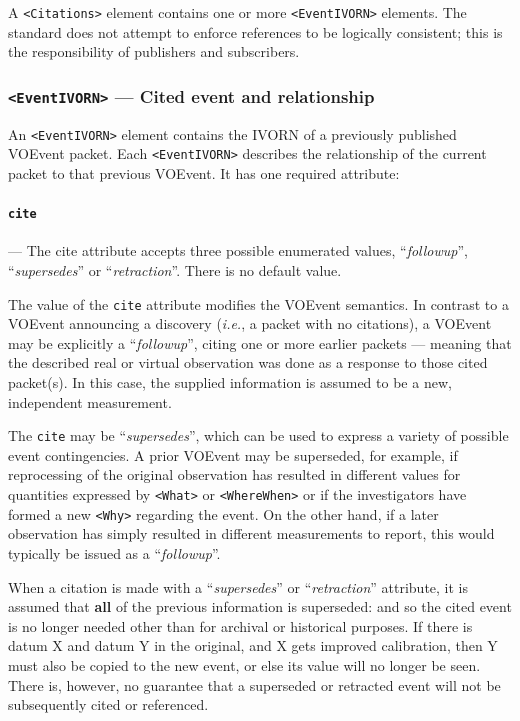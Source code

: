 \documentclass[11pt,a4paper]{ivoa}
\begin{document}
A {\tt <Citations>} element contains one or more {\tt <EventIVORN>} elements. The standard does not attempt to enforce references to be logically consistent; this is the responsibility of publishers and subscribers. 

\subsubsection{{\tt <EventIVORN>} --- Cited event and relationship}
\label{sec:3.7.1}
An {\tt <EventIVORN>} element contains the IVORN of a previously published VOEvent packet. Each {\tt <EventIVORN>} describes the relationship of the current packet to that previous VOEvent. It has one required attribute: 

\paragraph{\tt cite}\label{sec:3.7.1.1} --- The {cite} attribute accepts three possible enumerated values, ``\emph{followup}'', ``\emph{supersedes}'' or ``\emph{retraction}''. There is no default value. 

The value of the {\tt cite} attribute modifies the VOEvent semantics. In contrast to a VOEvent announcing a discovery (\emph{i.e.}, a packet with no citations), a VOEvent may be explicitly a ``\emph{followup}'', citing one or more earlier packets --- meaning that the described real or virtual observation was done as a response to those cited packet(s). In this case, the supplied information is assumed to be a new, independent measurement. 

The {\tt cite} may be ``\emph{supersedes}'', which can be used to express a variety of possible event contingencies. A prior VOEvent may be superseded, for example, if reprocessing of the original observation has resulted in different values for quantities expressed by {\tt <What>} or {\tt <WhereWhen>} or if the investigators have formed a new {\tt <Why>} regarding the event. On the other hand, if a later observation has simply resulted in different measurements to report, this would typically be issued as a ``\emph{followup}''. 

When a citation is made with a ``\emph{supersedes}'' or ``\emph{retraction}'' attribute, it is assumed that {\bf all} of the previous information is superseded: and so the cited event is no longer needed other than for archival or historical purposes. If there is datum X and datum Y in the original, and X gets improved calibration, then Y must also be copied to the new event, or else its value will no longer be seen. There is, however, no guarantee that a superseded or retracted event will not be subsequently cited or referenced. 
\end{document}
